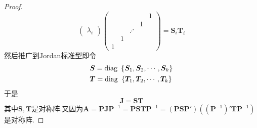 {\begin{proof}
\[\begin{pmatrix}
                \lambda_i
            \end{pmatrix}\begin{pmatrix}
                 &   &         &   & 1 \\
                 &   &         & 1     \\
                 &   & \iddots         \\
                 & 1                   \\
                1
            \end{pmatrix}=\bm{S}_i\bm{T}_i
        \]然后推广到Jordan标准型即令\begin{align*}
             & \bm{S}=\operatorname{diag\,} \,\left\{
            \bm{S}_1,\bm{S}_2,\cdots,\bm{S}_k
            \right\}                  \\
             & \bm{T}=\operatorname{diag\,} \,\left\{
            \bm{T}_1,\bm{T}_2,\cdots,\bm{T}_k
            \right\}
        \end{align*}于是\[
            \bm{J}=\bm{ST}
        \]其中$\bm{S},\bm{T}$是对称阵.又因为$\bm{A}=\bm{PJP}^{-1}=\bm{PSTP}^{-1}=\left(\bm{PSP}'\right)\left(\left(\bm{P}^{-1}\right)'\bm{TP}^{-1}\right)$是对称阵.
    \end{proof}
}
